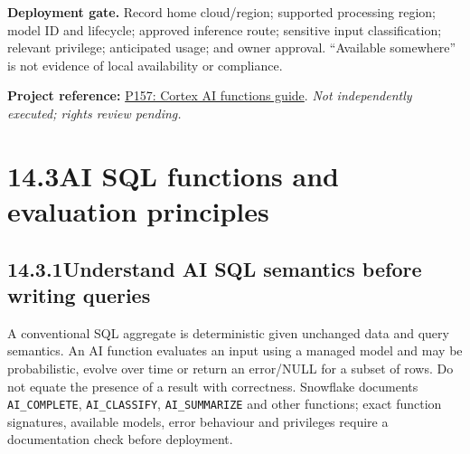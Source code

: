 \documentclass[11pt,twoside]{article}
\newcommand{\topic}[2]{\subsection*{#1\quad #2}}
\newcommand{\repo}[2]{\par\begingroup\fontsize{8.0}{9.6}\selectfont\sffamily\color{inkgray}\textbf{Project reference:} \href{#2}{#1}. \textit{Not independently executed; rights review pending.}\par\endgroup}
\begin{document}
\begin{insight}\textbf{Deployment gate.} Record home cloud/region; supported processing region; model ID and lifecycle; approved inference route; sensitive input classification; relevant privilege; anticipated usage; and owner approval. ``Available somewhere'' is not evidence of local availability or compliance.\end{insight}
\repo{P157: Cortex AI functions guide}{https://github.com/Snowflake-Labs/sfguide-getting-started-with-cortex-ai-functions}

\newpage

\section*{14.3\quad AI SQL functions and evaluation principles}
\topic{14.3.1}{Understand AI SQL semantics before writing queries}
A conventional SQL aggregate is deterministic given unchanged data and query semantics. An AI function evaluates an input using a managed model and may be probabilistic, evolve over time or return an error/NULL for a subset of rows. Do not equate the presence of a result with correctness. Snowflake documents \texttt{AI\_COMPLETE}, \texttt{AI\_CLASSIFY}, \texttt{AI\_SUMMARIZE} and other functions; exact function signatures, available models, error behaviour and privileges require a documentation check before deployment.
\end{document}
